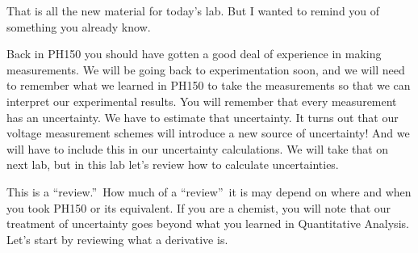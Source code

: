 That is all the new material for today's lab. But I wanted to remind you of
something you already know.

Back in PH150 you should have gotten a good deal of experience in making
measurements. We will be going back to experimentation soon, and we will
need to remember what we learned in PH150 to take the measurements so that
we can interpret our experimental results. You will remember that every
measurement has an uncertainty. We have to estimate that uncertainty. It
turns out that our voltage measurement schemes will introduce a new source
of uncertainty! And we will have to include this in our uncertainty
calculations. We will take that on next lab, but in this lab let's review
how to calculate uncertainties.

This is a \textquotedblleft review.\textquotedblright\ How much of a
\textquotedblleft review\textquotedblright\ it is may depend on where and
when you took PH150 or its equivalent. If you are a chemist, you will note
that our treatment of uncertainty goes beyond what you learned in
Quantitative Analysis. Let's start by reviewing what a derivative is.

